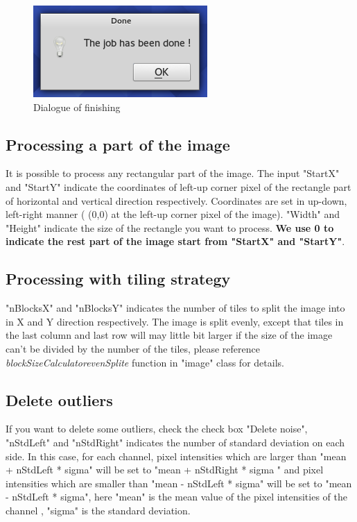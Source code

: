 \documentclass[10pt,a4paper]{article}
\begin{document}
\begin{figure}
\centering
	\includegraphics[scale=1]{figs/done.png}
\caption{Dialogue of finishing}
 \label{fig:done}
\end{figure}

\subsection{ Processing a part of the image}

It is possible to process any rectangular part of the image. The input "StartX" and "StartY" indicate the coordinates of left-up corner pixel of the rectangle part of horizontal and vertical direction respectively. Coordinates are set in up-down, left-right manner ( (0,0) at the left-up corner pixel of the image). "Width" and "Height" indicate the size of the rectangle you want to process. \textbf{We use 0 to indicate the rest part of the image start from "StartX" and "StartY"}. 

\subsection{ Processing with tiling strategy}

"nBlocksX" and "nBlocksY" indicates the number of tiles to split the image into in X and Y direction respectively. The image is split evenly, except that tiles in the last column and last row will may little bit larger if the size of the image can't be divided by the number of the tiles, please reference \textit{blockSizeCalculator\textunderscore evenSplite} function in "image" class for details.


\subsection{ Delete outliers }

If you want to delete some outliers, check the check box "Delete noise", "nStdLeft" and "nStdRight" indicates the number of standard deviation on each side. In this case, for each channel, pixel intensities which are larger than "mean + nStdLeft * sigma" will be set to "mean + nStdRight * sigma " and pixel intensities which are smaller than "mean - nStdLeft * sigma" will be set to "mean - nStdLeft * sigma", here "mean" is the mean value of the pixel intensities of the channel , "sigma" is the standard deviation.
\end{document}
